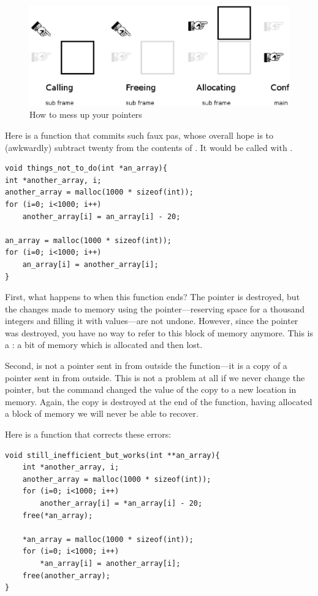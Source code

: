 \begin{figure}
\hskip -1cm
\includegraphics[width=\textwidth*\real{1.1}]{pointer_faux_pas.ps}
\caption{How to mess up your pointers}
\label{fauxpas}
\end{figure}


Here is a function that commits such faux pas,
whose overall hope is to (awkwardly) subtract twenty from
the contents of . It would be called with
.  
\begin{lstlisting}
void things_not_to_do(int *an_array){
int *another_array, i;
another_array = malloc(1000 * sizeof(int));
for (i=0; i<1000; i++)
    another_array[i] = an_array[i] - 20;

an_array = malloc(1000 * sizeof(int));
for (i=0; i<1000; i++)
    an_array[i] = another_array[i];
}
\end{lstlisting}

First, what happens to  when this function
ends? The pointer is destroyed, but the changes made to memory using
the pointer---reserving space for a thousand integers and filling it
with values---are not undone. However, since the pointer was destroyed,
you have no way to refer to this block of memory anymore.  This is a
: a bit of memory which is allocated and then lost.

Second,  is not a pointer sent in from outside the
function---it is a copy of a pointer sent in from outside. This is not
a problem at all if we never change the pointer, but the command
 changed the value of the copy
 to a new location in memory.  Again, the copy is
destroyed at the end of the function, having allocated a block of memory
we will never be able to recover.

Here is a function that corrects these errors:

\begin{lstlisting}
void still_inefficient_but_works(int **an_array){
    int *another_array, i;
    another_array = malloc(1000 * sizeof(int));
    for (i=0; i<1000; i++)
        another_array[i] = *an_array[i] - 20;
    free(*an_array);

    *an_array = malloc(1000 * sizeof(int));
    for (i=0; i<1000; i++)
        *an_array[i] = another_array[i];
    free(another_array);
}
\end{lstlisting}

